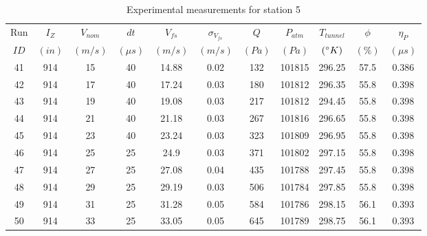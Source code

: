 \renewcommand\baselinestretch{1.3}\selectfont
\begin{table}[H]
\begin{center}
\begin{tabular}{|ccccccccccc|}
	\hline
	Run & $I_Z$ & $V_{nom}$ & $dt$ & $V_{fs}$ & $\sigma_{V_{fs}}$ & $Q$ & $P_{atm}$ & $T_{tunnel}$ & $\phi$ & $\eta_P$\\
	$ID$ & $(in)$ & $(m/s)$ & $(\mu s)$ & $(m/s)$ & $(m/s)$ & $(Pa)$ & $(Pa)$ & $(\degree K)$ & $(\%)$ & $(\mu s)$\\
	\hline
	41 & 914 & 15 & 40 & 14.88 & 0.02 & 132 & 101815 & 296.25 & 57.5 & 0.386\\
	42 & 914 & 17 & 40 & 17.24 & 0.03 & 180 & 101812 & 296.35 & 55.8 & 0.398\\
	43 & 914 & 19 & 40 & 19.08 & 0.03 & 217 & 101812 & 294.45 & 55.8 & 0.398\\
	44 & 914 & 21 & 40 & 21.18 & 0.03 & 267 & 101816 & 296.65 & 55.8 & 0.398\\
	45 & 914 & 23 & 40 & 23.24 & 0.03 & 323 & 101809 & 296.95 & 55.8 & 0.398\\
	46 & 914 & 25 & 25 & 24.9 & 0.03 & 371 & 101802 & 297.15 & 55.8 & 0.398\\
	47 & 914 & 27 & 25 & 27.08 & 0.04 & 435 & 101788 & 297.45 & 55.8 & 0.398\\
	48 & 914 & 29 & 25 & 29.19 & 0.03 & 506 & 101784 & 297.85 & 55.8 & 0.398\\
	49 & 914 & 31 & 25 & 31.28 & 0.05 & 584 & 101786 & 298.15 & 56.1 & 0.393\\
	50 & 914 & 33 & 25 & 33.05 & 0.05 & 645 & 101789 & 298.75 & 56.1 & 0.393\\
	\hline
\end{tabular}
\caption{Experimental measurements for station 5}
\label{table:station_5_measurements}
\end{center}
\end{table}
\renewcommand\baselinestretch{2}\selectfont
